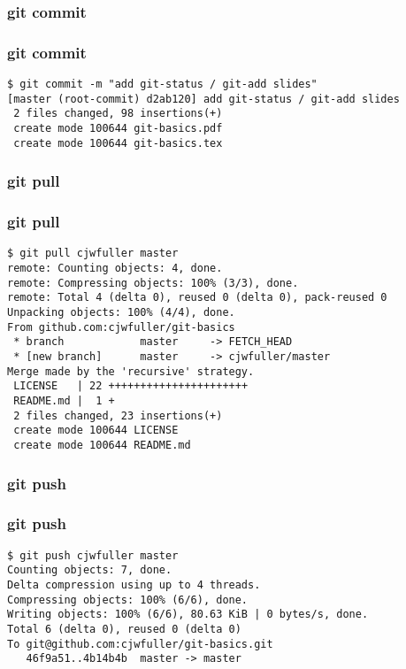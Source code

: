 \documentclass{beamer}
\begin{document}

\begin{frame}
\frametitle{git commit}

\end{frame}


\begin{frame}[fragile]
\frametitle{git commit}
	\scriptsize
	\begin{verbatim}
$ git commit -m "add git-status / git-add slides"
[master (root-commit) d2ab120] add git-status / git-add slides
 2 files changed, 98 insertions(+)
 create mode 100644 git-basics.pdf
 create mode 100644 git-basics.tex
	\end{verbatim}
\end{frame}


\begin{frame}
\frametitle{git pull}

\end{frame}


\begin{frame}[fragile]
\frametitle{git pull}
	\scriptsize
	\begin{verbatim}
$ git pull cjwfuller master
remote: Counting objects: 4, done.
remote: Compressing objects: 100% (3/3), done.
remote: Total 4 (delta 0), reused 0 (delta 0), pack-reused 0
Unpacking objects: 100% (4/4), done.
From github.com:cjwfuller/git-basics
 * branch            master     -> FETCH_HEAD
 * [new branch]      master     -> cjwfuller/master
Merge made by the 'recursive' strategy.
 LICENSE   | 22 ++++++++++++++++++++++
 README.md |  1 +
 2 files changed, 23 insertions(+)
 create mode 100644 LICENSE
 create mode 100644 README.md
	\end{verbatim}
\end{frame}


\begin{frame}
\frametitle{git push}

\end{frame}


\begin{frame}[fragile]
\frametitle{git push}
	\scriptsize
	\begin{verbatim}
$ git push cjwfuller master
Counting objects: 7, done.
Delta compression using up to 4 threads.
Compressing objects: 100% (6/6), done.
Writing objects: 100% (6/6), 80.63 KiB | 0 bytes/s, done.
Total 6 (delta 0), reused 0 (delta 0)
To git@github.com:cjwfuller/git-basics.git
   46f9a51..4b14b4b  master -> master
	\end{verbatim}
\end{frame}
\end{document}
